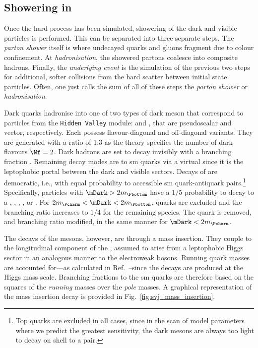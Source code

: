 

\subsection{Showering in \texorpdfstring{\PYTHIA}{Pythia}}
\label{subsec:svj_showering_pythia}

Once the hard process has been simulated, showering of the dark and visible particles is performed. This can be separated into three separate steps. The \emph{parton shower} itself is where undecayed quarks and gluons fragment due to colour confinement. At \emph{hadronisation}, the showered partons coalesce into composite hadrons. Finally, the \emph{underlying event} is the simulation of the previous two steps for additional, softer collisions from the hard scatter between initial state particles. Often, one just calls the sum of all of these steps the \emph{parton shower} or \emph{hadronisation}.

Dark quarks hadronise into one of two types of dark meson that correspond to particles from the \texttt{Hidden Valley} module: \Ppidark and \Prhodark, that are pseudoscalar and vector, respectively. Each possess flavour-diagonal and off-diagonal variants. They are generated with a ratio of 1:3 as the theory specifies the number of dark flavours $\Nf = \text{2}$. Dark hadrons are set to decay invisibly with a branching fraction \rinv. Remaining decay modes are to \acrshort{sm} quarks via a virtual \PZprime since it is the leptophobic portal between the dark and visible sectors. Decays of \Prhodark are democratic, i.e., with equal probability to accessible \acrshort{sm} quark-antiquark pairs.\footnote{Top quarks are excluded in all cases, since in the scan of model parameters where we predict the greatest sensitivity, the dark mesons are always too light to decay on shell to a \ttbar pair.} Specifically, \Prhodark particles with $\mDark > \text{2}m_{\Pbottom}$ have a $\text{1}/\text{5}$ probability to decay to a \Pup, \Pdown, \Pcharm, \Pstrange, or \Pbottom. For $2m_{\Pcharm} < \mDark < 2m_{\Pbottom}$, \Pbottom quarks are excluded and the branching ratio increases to $\text{1}/\text{4}$ for the remaining species. The \Pcharm quark is removed, and branching ratio modified, in the same manner for $\mDark < 2m_{\Pcharm}$.

The decays of the \Ppidark mesons, however, are through a mass insertion. They couple to the longitudinal component of the \PZprime, assumed to arise from a leptophobic Higgs sector in an analogous manner to the electroweak bosons. Running quark masses are accounted for---as calculated in Ref.~--since the decays are produced at the Higgs mass scale. Branching fractions to the \acrshort{sm} quarks are therefore based on the squares of the \emph{running} masses over the \emph{pole} masses. A graphical representation of the mass insertion decay is provided in Fig.~\ref{fig:svj_mass_insertion}.

